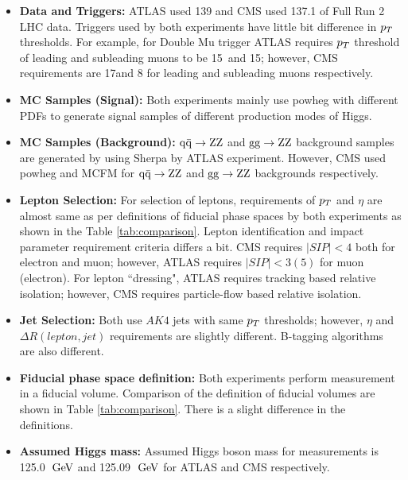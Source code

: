 \begin{itemize}
 
 \item \textbf{Data and Triggers:} ATLAS used 139 \ifb and CMS used 137.1 \ifb of Full Run 2 LHC data. Triggers used by both experiments have little bit difference in $p_T$ thresholds. For example, for Double Mu trigger ATLAS requires $p_T$ threshold of leading and subleading muons to be 15\GeV ~and  15\GeV; however, CMS requirements are 17\GeV and 8 \GeV for leading and subleading muons respectively. %
 \item \textbf{MC Samples (Signal):} Both experiments mainly use {\sc powheg} with different PDFs to generate signal samples of different production modes of Higgs.
 \item \textbf{MC Samples (Background):} $\mathrm{q}\bar{\mathrm{q}}\rightarrow\mathrm{Z}\mathrm{Z}$ and $\mathrm{g}\mathrm{g}\rightarrow\mathrm{Z}\mathrm{Z}$ background samples are generated by using {\sc Sherpa} by ATLAS experiment. However, CMS used {\sc powheg} and {\sc MCFM } for $\mathrm{q}\bar{\mathrm{q}}\rightarrow\mathrm{Z}\mathrm{Z}$ and $\mathrm{g}\mathrm{g}\rightarrow\mathrm{Z}\mathrm{Z}$ backgrounds respectively. 
 \item \textbf{Lepton Selection:} For selection of leptons, requirements of  $p_T$ and $\eta$ are almost same as per definitions of fiducial phase spaces by both experiments as shown in the Table \ref{tab:comparison}. Lepton identification and impact parameter requirement criteria differs a bit.  CMS requires $|SIP| < 4$ both for electron and muon; however, ATLAS requires $|SIP| < 3(5)$ for muon (electron).  For lepton ``dressing", ATLAS requires tracking based relative isolation; however, CMS requires particle-flow based relative isolation.
 \item \textbf{Jet Selection:} Both use $AK4$ jets with same  $p_T$ thresholds; however, $\eta$ and $\Delta R(lepton,jet)$ requirements are slightly different. B-tagging algorithms are also different. %
	\item \textbf{Fiducial phase space definition:} Both experiments perform measurement in a fiducial volume. Comparison of the definition of fiducial volumes are shown in Table \ref{tab:comparison}. There is a slight difference in the definitions.   
	\item \textbf{Assumed Higgs mass:} Assumed Higgs boson mass for measurements is 125.0 $\hbox{$\;\hbox{\rm GeV}$}$ and 125.09 $\hbox{$\;\hbox{\rm GeV}$}$ for ATLAS and CMS respectively. %

\end{itemize}
